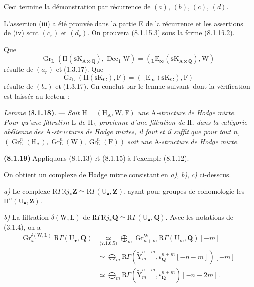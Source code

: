 \documentclass[11pt,leqno]{article}
\begin{document}
Ceci termine la démonstration par récurrence de \((a)\), \((b)\), \((c)\), \((d)\).

L’assertion (iii) a été prouvée dans la partie E de la récurrence et les assertions de (iv) sont \((c_{r})\) et \((d_{r})\). On prouvera (8.1.15.3) sous la forme (8.1.16.2).

Que
\[
\operatorname{Gr}_{\mathrm{L}}
(\mathrm{H}(\mathbf{s}\mathrm{K}_{\mathrm{A}\otimes\mathbf{Q}}),
\operatorname{Dec}_{1}\mathrm{W})
=
({}_{\mathrm{L}}\mathrm{E}_{\infty}
(\mathbf{s}\mathrm{K}_{\mathrm{A}\otimes\mathbf{Q}}),\mathrm{W})
\]
résulte de \((a_{r})\) et (1.3.17). Que
\[
\operatorname{Gr}_{\mathrm{L}}
(\mathrm{H}(\mathbf{s}\mathrm{K}_{\mathbf{C}}),\mathrm{F})
=
({}_{\mathrm{L}}\mathrm{E}_{\infty}
(\mathbf{s}\mathrm{K}_{\mathbf{C}}),\mathrm{F})
\]
résulte de \((b_{r})\) et (1.3.17). On conclut par le lemme suivant, dont la vérification est laissée au lecteur :

\textit{Lemme} \textbf{(8.1.18)}. — \textit{Soit \(\mathrm{H}=(\mathrm{H}_{\mathrm{A}},\mathrm{W},\mathrm{F})\) une \(\mathrm{A}\)-structure de Hodge mixte. Pour qu’une filtration \(\mathrm{L}\) de \(\mathrm{H}_{\mathrm{A}}\) provienne d’une filtration de \(\mathrm{H}\), dans la catégorie abélienne des \(\mathrm{A}\)-structures de Hodge mixtes, il faut et il suffit que pour tout \(n\), \((\operatorname{Gr}_{\mathrm{L}}^{n}(\mathrm{H}_{\mathrm{A}}),\operatorname{Gr}_{\mathrm{L}}^{n}(\mathrm{W}),\operatorname{Gr}_{\mathrm{L}}^{n}(\mathrm{F}))\) soit une \(\mathrm{A}\)-structure de Hodge mixte.}

\textbf{(8.1.19)} Appliquons (8.1.13) et (8.1.15) à l’exemple (8.1.12).

On obtient un complexe de Hodge mixte consistant en \textit{a)}, \textit{b)}, \textit{c)} ci-dessous.

\textit{a)} Le complexe \(\mathrm{R}\Gamma\mathrm{R}j_{\ast}\mathbf{Z}\simeq\mathrm{R}\Gamma(\mathrm{U}_{\bullet},\mathbf{Z})\), ayant pour groupes de cohomologie les \(\mathrm{H}^{n}(\mathrm{U}_{\bullet},\mathbf{Z})\).

\textit{b)} La filtration \(\delta(\mathrm{W},\mathrm{L})\) de \(\mathrm{R}\Gamma\mathrm{R}j_{\ast}\mathbf{Q}\simeq\mathrm{R}\Gamma(\mathrm{U}_{\bullet},\mathbf{Q})\). Avec les notations de (3.1.4), on a
\begin{align*}
\operatorname{Gr}_{n}^{\delta(\mathrm{W},\mathrm{L})}
\mathrm{R}\Gamma(\mathrm{U}_{\bullet},\mathbf{Q})
&\underset{\text{(7.1.6.5)}}{\simeq}
\bigoplus_m
\operatorname{Gr}_{n+m}^{\mathrm{W}}
\mathrm{R}\Gamma(\mathrm{U}_{m},\mathbf{Q})[-m]
\\
&\simeq
\bigoplus_m
\mathrm{R}\Gamma
(\widetilde{\mathrm{Y}}_{m}^{n+m},
\varepsilon_{\mathbf{Q}}^{n+m}[-n-m])[-m]
\\
&\simeq
\bigoplus_m
\mathrm{R}\Gamma
(\widetilde{\mathrm{Y}}_{m}^{n+m},
\varepsilon_{\mathbf{Q}}^{n+m})[-n-2m].
\end{align*}
\end{document}

